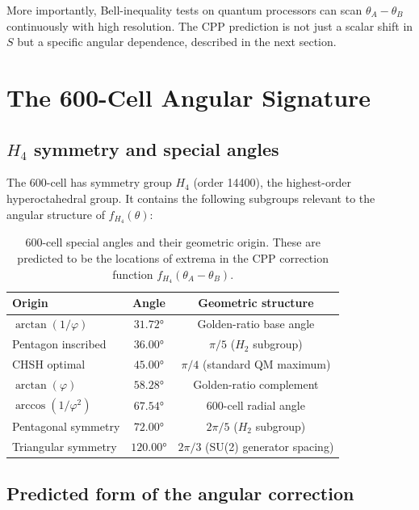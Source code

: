 \documentclass[11pt,letterpaper]{article}
\newcommand{\phig}{\varphi}
\begin{document}
More importantly, Bell-inequality tests on quantum processors can
scan $\theta_A - \theta_B$ continuously with high resolution.
The CPP prediction is not just a scalar shift in $S$ but a specific
angular dependence, described in the next section.

\section{The 600-Cell Angular Signature}
\label{sec:angular}

\subsection{$H_4$ symmetry and special angles}

The 600-cell has symmetry group $H_4$ (order 14400), the highest-order
hyperoctahedral group.  It contains the following subgroups relevant
to the angular structure of $f_{H_4}(\theta)$:

\begin{table}[H]
\centering
\caption{600-cell special angles and their geometric origin.
  These are predicted to be the locations of extrema in the CPP
  correction function $f_{H_4}(\theta_A - \theta_B)$.}
\label{tab:angles}
\begin{tabular}{@{}lcc@{}}
\toprule
Origin & Angle & Geometric structure \\
\midrule
$\arctan(1/\phig)$ & $31.72°$ & Golden-ratio base angle \\
Pentagon inscribed & $36.00°$ & $\pi/5$ ($H_2$ subgroup) \\
CHSH optimal & $45.00°$ & $\pi/4$ (standard QM maximum) \\
$\arctan(\phig)$ & $58.28°$ & Golden-ratio complement \\
$\arccos(1/\phig^2)$ & $67.54°$ & 600-cell radial angle \\
Pentagonal symmetry & $72.00°$ & $2\pi/5$ ($H_2$ subgroup) \\
Triangular symmetry & $120.00°$ & $2\pi/3$ (SU(2) generator spacing) \\
\bottomrule
\end{tabular}
\end{table}

\subsection{Predicted form of the angular correction}
\end{document}
